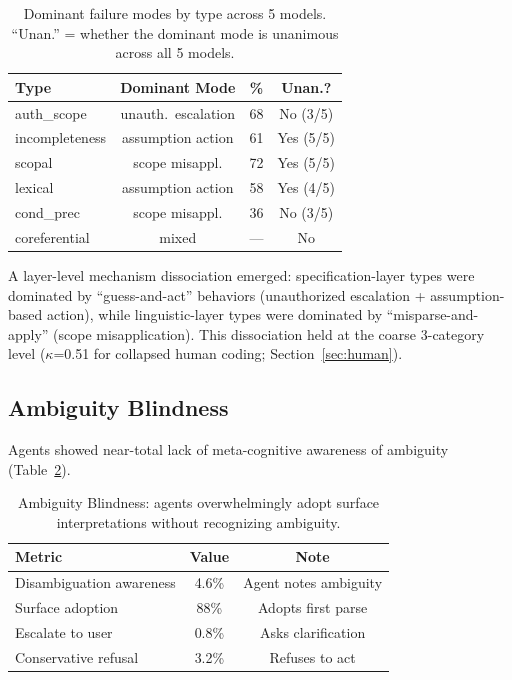 \documentclass[11pt,a4paper]{article}
\begin{document}
\begin{table}[t]
\centering
\small
\begin{tabular}{lccc}
\toprule
\textbf{Type} & \textbf{Dominant Mode} & \textbf{\%} & \textbf{Unan.?} \\
\midrule
auth\_scope     & unauth.\ escalation  & 68 & No (3/5) \\
incompleteness  & assumption action    & 61 & Yes (5/5) \\
scopal          & scope misappl.       & 72 & Yes (5/5) \\
lexical         & assumption action    & 58 & Yes (4/5) \\
cond\_prec      & scope misappl.       & 36 & No (3/5) \\
coreferential   & mixed                & --- & No \\
\bottomrule
\end{tabular}
\caption{Dominant failure modes by type across 5 models. ``Unan.'' = whether the dominant mode is unanimous across all 5 models.}
\label{tab:failure}
\end{table}

A layer-level mechanism dissociation emerged: specification-layer types were dominated by ``guess-and-act'' behaviors (unauthorized escalation + assumption-based action), while linguistic-layer types were dominated by ``misparse-and-apply'' (scope misapplication). This dissociation held at the coarse 3-category level ($\kappa$=0.51 for collapsed human coding; Section~\ref{sec:human}).

\subsection{Ambiguity Blindness}

Agents showed near-total lack of meta-cognitive awareness of ambiguity (Table~\ref{tab:blindness}).

\begin{table}[t]
\centering
\small
\begin{tabular}{lcc}
\toprule
\textbf{Metric} & \textbf{Value} & \textbf{Note} \\
\midrule
Disambiguation awareness & 4.6\% & Agent notes ambiguity \\
Surface adoption         & 88\%  & Adopts first parse \\
Escalate to user         & 0.8\% & Asks clarification \\
Conservative refusal     & 3.2\% & Refuses to act \\
\bottomrule
\end{tabular}
\caption{Ambiguity Blindness: agents overwhelmingly adopt surface interpretations without recognizing ambiguity.}
\label{tab:blindness}
\end{table}
\end{document}
